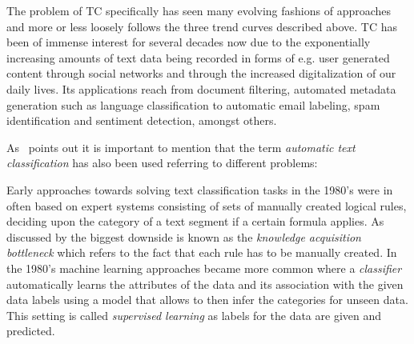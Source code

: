 The problem of \gls{TC} specifically has seen many evolving fashions of approaches and more or less loosely follows the three trend curves described above. \gls{TC} has been of immense interest for several decades now due to the exponentially increasing amounts of text data being recorded in forms of e.g. user generated content through social networks and through the increased digitalization of our daily lives. Its applications reach from document filtering, automated metadata generation such as language classification to automatic email labeling, spam identification and sentiment detection, amongst others.

As~\cite{Sebastiani:2002aa} points out it is important to mention that the term \emph{automatic text classification} has also been used referring to different problems: ~\cite{Sebastiani:2002aa}

Early approaches towards solving text classification tasks in the 1980's were in often based on expert systems consisting of sets of manually created logical rules, deciding upon the category of a text segment if a certain formula applies. As discussed by \cite{Sebastiani:2002aa} the biggest downside is known as the \emph{knowledge acquisition bottleneck} which refers to the fact that each rule has to be manually created. In the 1980's machine learning approaches became more common where a \emph{classifier} automatically learns the attributes of the data and its association with the given data labels using a model that allows to then infer the categories for unseen data. This setting is called \emph{supervised learning} as labels for the data are given and predicted.

